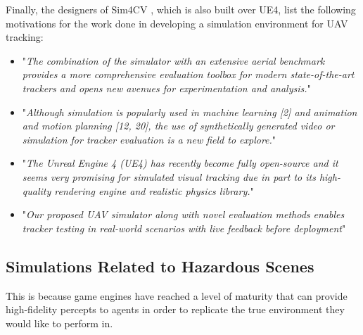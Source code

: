 Finally, the designers of Sim4CV \cite{Mueller2016ATracking}, which is also built over UE4, list the following motivations for the work done in developing a simulation environment for UAV tracking:
\begin{itemize}
    \item "\textit{The combination of the simulator with an extensive aerial benchmark provides a more comprehensive evaluation toolbox for modern state-of-the-art trackers and opens new avenues for experimentation and analysis.}"
    \item {} "\textit{Although simulation is popularly used in machine learning [2] and animation and motion planning [12, 20], the use of synthetically generated video or simulation for tracker evaluation is a new field to explore.}"
    \item "\textit{The Unreal Engine 4 (UE4) has recently become fully open-source and it seems very promising for simulated visual tracking due in part to its high-quality rendering engine and realistic physics library.}"
    \item "\textit{Our proposed UAV simulator along with novel evaluation methods enables tracker testing in real-world scenarios with live feedback before deployment}"
\end{itemize}

\subsection{Simulations Related to Hazardous Scenes}


This is because game engines have reached a level of maturity that can provide high-fidelity percepts to agents in order to replicate the true environment they would like to perform in. 


